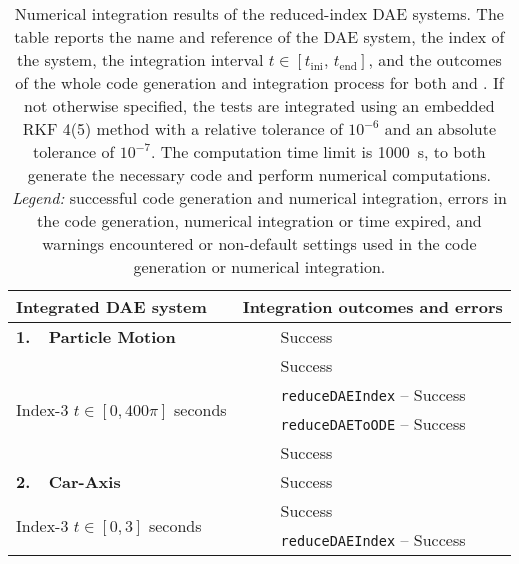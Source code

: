\setlength\tabcolsep{0.15em}
\setlength{\LTcapwidth}{\textwidth}
{\footnotesize\centering\begin{longtable}{lccl}
  \caption{Numerical integration results of the reduced-index \ac{DAE} systems. The table reports the name and reference of the \ac{DAE} system, the index of the system, the integration interval $t \in [t_{\text{ini}}, \, t_{\text{end}}]$, and the outcomes of the whole code generation and integration process for both \Maple{} and \Indigo{}. If not otherwise specified, the tests are integrated using an embedded \ac{RKF} 4(5) method with a relative tolerance of $10^{-6}$ and an absolute tolerance of $10^{-7}$. The computation time limit is \SI{1000}{\second}, to both generate the necessary code and perform numerical computations. \emph{Legend:} \mycheckmark{} successful code generation and numerical integration, \mycrossmark{} errors in the code generation, numerical integration or time expired, and \mywarnmark{} warnings encountered or non-default settings used in the code generation or numerical integration.}
  \label{chap5:tab:numerical_integration}
  \endfirsthead
  \endhead
  \toprule
  \textbf{Integrated \ac{DAE} system} &
  \multicolumn{3}{l}{\textbf{Integration outcomes and errors}} \\
  \midrule
  \multirow{1}{*}{\textbf{1.~~Particle Motion~\cite{campbell1995constraint}}}
    & \Maple{}       & \mycheckmark{}\phantom{\mywarnmark{}} & Success \\ \cmidrule{2-4}
    \multirow{4}{*}{Index-3 \quad $t \in [0, 400\pi]$ seconds} & \Mathematica{} & \mycheckmark{}\phantom{\mywarnmark{}} & Success \\ \cmidrule{2-4}
    & \multirow{2}{*}{\Matlab{}} & \mycheckmark{}\phantom{\mywarnmark{}} & \texttt{reduceDAEIndex} -- Success \\ \cmidrule{3-4}
    &                            & \mycheckmark{}\phantom{\mywarnmark{}} & \texttt{reduceDAEToODE} -- Success \\ \cmidrule{2-4}\cmidrule{2-4}
    & \Indigo{} & \mycheckmark{}\phantom{\mywarnmark{}} & Success \\ \midrule
  \multirow{1}{*}{\textbf{2.~~Car-Axis~\cite{lioen1998test, mazzia2008test}}}
    & \Maple{}       & \mycheckmark{}\phantom{\mywarnmark{}} & Success \\ \cmidrule{2-4}
    \multirow{4}{*}{Index-3 \quad $t \in [0, 3]$ seconds} & \Mathematica{} & \mycheckmark{}\phantom{\mywarnmark{}} & Success \\ \cmidrule{2-4}
    & \multirow{2}{*}{\Matlab{}} & \mycheckmark{}\phantom{\mywarnmark{}} & \texttt{reduceDAEIndex} -- Success \\ \cmidrule{3-4}

\end{longtable}}
